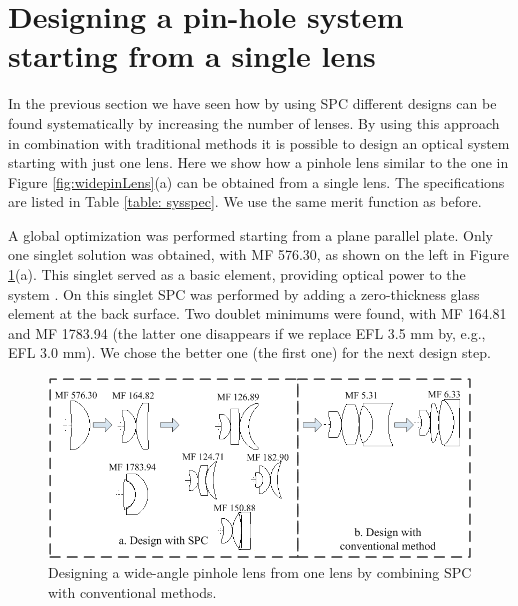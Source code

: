 \section{Designing a pin-hole system starting from a single lens} \label{chrom90d}

In the previous section we have seen how by using SPC different designs can be found systematically by increasing the number of lenses. By using this approach in combination with traditional methods it is possible to design an optical system starting with just one lens. Here we show how a pinhole lens similar to the one in Figure \ref{fig:widepinLens}(a) can be obtained from a single lens. The specifications are listed in Table \ref{table: sysspec}. We use the same merit function as before.

A global optimization was performed starting from a plane parallel plate. Only one singlet solution was obtained, with MF 576.30, as shown on the left in Figure \ref{fig:WideAngleDesign}(a). This singlet served as a basic element, providing optical power to the system \cite{LivshitsQA2013}. On this singlet SPC was performed by adding a zero-thickness glass element at the back surface. Two doublet minimums were found, with MF 164.81 and MF 1783.94 (the latter one disappears if we replace EFL 3.5 mm by, e.g., EFL 3.0 mm). We chose the better one (the first one) for the next design step. 

\begin{figure}[h!]
    \centering
    \includegraphics[width=1.0\textwidth]{chapter-3/figures/WideAngleDesign.png}
    \caption{Designing a wide-angle pinhole lens from one lens by combining SPC with conventional methods.}
    \label{fig:WideAngleDesign}
\end{figure}

